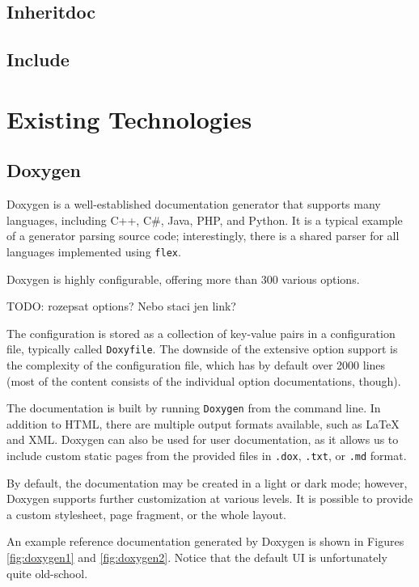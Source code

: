 \subsection{Inheritdoc}

\subsection{Include}

\section{Existing Technologies}

\subsection{Doxygen}

Doxygen is a well-established documentation generator that supports many languages, including C++, C\#, Java, PHP, and Python.
It is a typical example of a generator parsing source code; 
interestingly, there is a shared parser for all languages implemented using \texttt{flex}.~\cite{doxygen_docs} 

Doxygen is highly configurable, offering more than 300 various options.

TODO: rozepsat options? Nebo staci jen link?

The configuration is stored as a collection of key-value pairs in a configuration file, typically called \texttt{Doxyfile}.
The downside of the extensive option support is the complexity of the configuration file,
which has by default over 2000 lines (most of the content consists of the individual option documentations, though).

The documentation is built by running \texttt{Doxygen} from the command line.
In addition to HTML, there are multiple output formats available, such as LaTeX and XML.
Doxygen can also be used for user documentation, as it allows us to include custom static pages from the provided files in \texttt{.dox}, \texttt{.txt}, or \texttt{.md} format.~\cite{doxygen_docs}

By default, the documentation may be created in a light or dark mode; however, Doxygen supports further customization at various levels.
It is possible to provide a custom stylesheet, page fragment, or the whole layout.

An example reference documentation generated by Doxygen is shown in Figures \ref{fig:doxygen1} and \ref{fig:doxygen2}. Notice that the default UI is unfortunately quite old-school.

